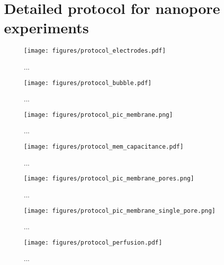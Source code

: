 \chapter{Detailed protocol for nanopore experiments}
\label{protocol}

\begin{figure}[h]
\begin{centering}
\texttt{[image: figures/protocol\_electrodes.pdf]}
\caption[Preparing silver chloride electrodes]{...}
\label{fig:helicase_data}
\end{centering}
\end{figure}

\begin{figure}[h]
\begin{centering}
\texttt{[image: figures/protocol\_bubble.pdf]}
\caption[Establishing a lipid membrane with a bubble]{...}
\label{fig:helicase_data}
\end{centering}
\end{figure}

\begin{figure}[h]
\begin{centering}
\texttt{[image: figures/protocol\_pic\_membrane.png]}
\caption[Diagram of membrane on Teflon patch tube]{...}
\label{fig:helicase_data}
\end{centering}
\end{figure}

\begin{figure}[h]
\begin{centering}
\texttt{[image: figures/protocol\_mem\_capacitance.pdf]}
\caption[Monitoring membrane capacitance]{...}
\label{fig:helicase_data}
\end{centering}
\end{figure}

\begin{figure}[h]
\begin{centering}
\texttt{[image: figures/protocol\_pic\_membrane\_pores.png]}
\caption[Diagram of nanopore introduction]{...}
\label{fig:helicase_data}
\end{centering}
\end{figure}

\begin{figure}[h]
\begin{centering}
\texttt{[image: figures/protocol\_pic\_membrane\_single\_pore.png]}
\caption[Diagram of single nanopore capture]{...}
\label{fig:helicase_data}
\end{centering}
\end{figure}

\begin{figure}[h]
\begin{centering}
\texttt{[image: figures/protocol\_perfusion.pdf]}
\caption[Setup for removing nanopores by buffer perfusion]{...}
\label{fig:helicase_data}
\end{centering}
\end{figure}